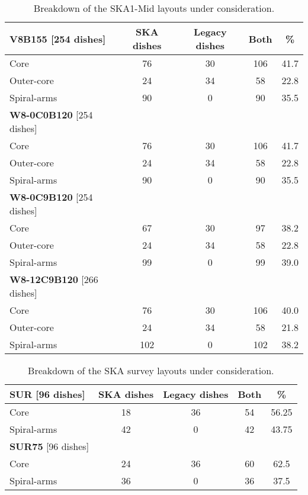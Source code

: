 \documentclass[sfheadings,a4paper,times,9pt,floats,floatfix]{article}
\begin{document}
\begin{table}[H]
\centering
 \tiny{
 \begin{tabular}{l|cccc}\hline
 {\bf V8B155} [254 dishes] & SKA dishes&  Legacy dishes & Both & \% \\\hline\hline
  Core & 76 & 30 & 106 & 41.7 \\
 Outer-core & 24 & 34 & 58 & 22.8 \\
 Spiral-arms & 90 & 0 & 90 & 35.5 \\\hline\hline
  {\bf W8-0C0B120} [254 dishes] &  & &  & \\\hline\hline
  Core & 76 & 30 & 106 & 41.7 \\
 Outer-core & 24 & 34 & 58 & 22.8 \\
 Spiral-arms & 90 & 0 & 90 & 35.5 \\\hline\hline
  {\bf W8-0C9B120} [254 dishes] &  & &  & \\\hline\hline
  Core & 67 & 30 & 97 & 38.2 \\
 Outer-core & 24 & 34 & 58 & 22.8 \\
 Spiral-arms & 99 & 0 & 99 & 39.0 \\\hline\hline
   {\bf W8-12C9B120} [266 dishes] &  & &  & \\\hline\hline
  Core & 76 & 30 & 106 & 40.0 \\
 Outer-core & 24 & 34 & 58 & 21.8 \\
 Spiral-arms & 102 & 0 & 102 & 38.2 \\\hline\hline
  \end{tabular}}
 \caption{Breakdown of the SKA1-Mid layouts under consideration.}\label{tab:lay}
\end{table}

\begin{table}[H]
\centering
 \tiny{
 \begin{tabular}{l|cccc}\hline
 {\bf SUR} [96 dishes] & SKA dishes&  Legacy dishes & Both & \% \\\hline\hline
 Core & 18 & 36 & 54 & 56.25 \\
 Spiral-arms & 42 & 0 & 42 & 43.75 \\\hline\hline
 {\bf SUR75} [96 dishes] &  & &  & \\\hline\hline
 Core & 24 & 36 & 60 & 62.5 \\
 Spiral-arms & 36 & 0 & 36 & 37.5 \\\hline\hline
 \end{tabular}}
 \caption{Breakdown of the SKA survey layouts under consideration.}\label{tab:lay}
\end{table}
\end{document}
